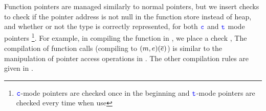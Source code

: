 {
%
Function pointers are managed similarly to normal pointers,
but we insert checks to check if the pointer address is not null in 
the function store instead of heap, and whether or not the type is correctly represented, 
for both $\textcolor{blue}{\texttt{c}}$ and $\textcolor{blue}{\texttt{t}}$ mode pointers 
\footnote{$\textcolor{blue}{\texttt{c}}$-mode pointers are checked once in the beginning and $\textcolor{blue}{\texttt{t}}$-mode pointers are checked every time when use}.
For example, in compiling the  function in ,
we place a check ,
The compilation of function calls (compiling to ${(m,e)}({\overline{e}})$) 
is similar to the manipulation of pointer access operations in .
The other compilation rules are given in .
}
